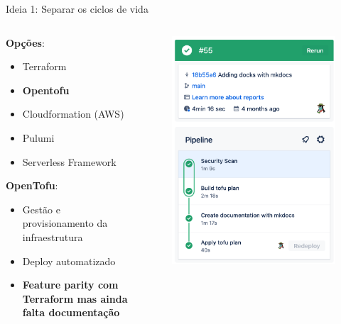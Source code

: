 \documentclass[aspectratio=169]{beamer}
\begin{document}
\begin{frame}{Ideia 1: Separar os ciclos de vida}
	
	\begin{columns}[T] %
		
		\begin{column}[T]{10cm} %

\textbf{Opções}:
	\begin{itemize}
		\item Terraform
		\item \textbf{Opentofu}
		\item Cloudformation (AWS)
		\item Pulumi
		\item Serverless Framework
	\end{itemize}
\textbf{OpenTofu}:
	\begin{itemize}
		\item Gestão e provisionamento da infraestrutura
		\item Deploy automatizado
		\item \textbf{Feature parity com Terraform mas ainda falta documentação}
	\end{itemize}
		\end{column}
		\begin{column}[T]{5cm} %
			\begin{figure}
			\centering
			\includegraphics[width=\linewidth]{Images/tofupipeline}
		\end{figure}
		

\end{column}
\end{columns}
\end{frame}
\end{document}
